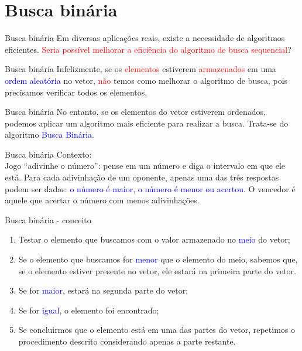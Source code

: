 \documentclass{beamer}
\newcommand{\tcb}[1]{\textcolor{blue}{#1}}
\newcommand{\tcr}[1]{\textcolor{red}{#1}}
\begin{document}
	\section{Busca binária}

	\begin{frame}[c]{Busca binária}
		Em diversas aplicações reais, existe a necessidade de algoritmos
		eficientes. \tcr{Seria possível melhorar a eficiência do algoritmo
		de busca sequencial}?
	\end{frame}

	\begin{frame}[c]{Busca binária}
		Infelizmente, se os \tcr{elementos} estiverem \tcr{armazenados} em uma 
		\tcb{ordem aleatória} no vetor, \tcr{não} temos como melhorar o algoritmo
		de busca, pois precisamos verificar todos os elementos.
	\end{frame}
	
	\begin{frame}[c]{Busca binária}
		No entanto, se os elementos do vetor estiverem ordenados, podemos aplicar
		um algoritmo mais eficiente para realizar a busca. Trata-se do algoritmo
		\tcb{Busca Binária}.
	\end{frame}
	
	\begin{frame}[c]{Busca binária}
		Contexto:\\
		Jogo ``adivinhe o número'': pense em um número e diga o intervalo em que ele
		está. Para cada adivinhação de um oponente, apenas uma das três respostas
		podem ser dadas: \tcb{o número é maior, o número é menor ou acertou}. O vencedor
		é aquele que acertar o número com menos adivinhações.
	\end{frame}
	
	\begin{frame}[c]{Busca binária - conceito}
		\begin{enumerate}
			\item Testar o elemento que buscamos com o valor armazenado no \tcb{meio} do vetor;
			\item Se o elemento que buscamos for \tcb{menor} que o elemento do meio, sabemos que, se
			o elemento estiver presente no vetor, ele estará na primeira parte do vetor.
			\item Se for \tcb{maior}, estará na segunda parte do vetor;
			\item Se for \tcb{igual}, o elemento foi encontrado;
			\item Se concluirmos que o elemento está em uma das partes do vetor, 
				repetimos o procedimento descrito considerando apenas a parte restante.
		\end{enumerate}
	\end{frame}
\end{document}
